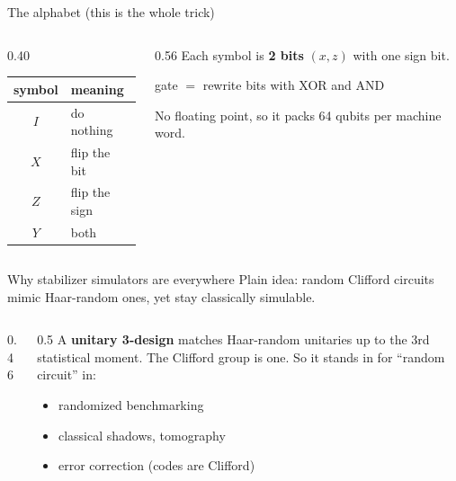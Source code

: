 \documentclass[aspectratio=169]{beamer}
\begin{document}
\begin{frame}{The alphabet (this is the whole trick)}
  \begin{columns}[c]
    \begin{column}{0.40\textwidth}
      \centering
      \begin{tabular}{cl}
        \toprule
        symbol & meaning \\
        \midrule
        $I$ & do nothing \\
        $X$ & flip the bit \\
        $Z$ & flip the sign \\
        $Y$ & both \\
        \bottomrule
      \end{tabular}
    \end{column}
    \begin{column}{0.56\textwidth}
      Each symbol is \textbf{2 bits} $(x,z)$ with one sign bit.
      \vspace{2mm}
      \begin{center}\large gate $=$ rewrite bits with XOR and AND\end{center}
      \vspace{1mm}
      No floating point, so it packs 64 qubits per machine word.
    \end{column}
  \end{columns}
\end{frame}

\begin{frame}{Why stabilizer simulators are everywhere}
  \alert{Plain idea:} random Clifford circuits mimic Haar-random ones, yet stay classically simulable.
  \vfill
  \begin{columns}[c]
    \begin{column}{0.46\textwidth}
      \centering
    \end{column}
    \begin{column}{0.5\textwidth}
      A \textbf{unitary 3-design} matches Haar-random unitaries up to the 3rd statistical moment.
      The Clifford group is one. So it stands in for ``random circuit'' in:
      \begin{itemize}
        \item randomized benchmarking
        \item classical shadows, tomography
        \item error correction (codes are Clifford)
      \end{itemize}
    \end{column}
  \end{columns}
\end{frame}
\end{document}
